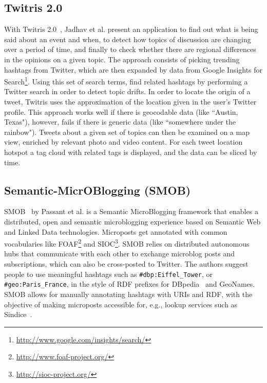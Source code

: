 \documentclass[runningheads,a4paper]{llncs}
\begin{document}
\subsection{Twitris 2.0}
With Twitris 2.0~\cite{Jadhav:Twitris}, Jadhav et al. present an application to find out what is being said about an event and when, to detect how topics of discussion are changing over a period of time, and finally to check whether there are regional differences in the opinions on a given topic. The approach consists of picking trending hashtags from Twitter, which are then expanded by data from Google Insights for Search\footnote{\url{http://www.google.com/insights/search/}}. Using this set of search terms, find related hashtags by performing a Twitter search in order to detect topic drifts. In order to locate the origin of a tweet, Twitris uses the approximation of the location given in the user's Twitter profile. This approach works well if there is geocodable data (like ``Austin, Texas"), however, fails if there is generic data (like ``somewhere under the rainbow"). Tweets about a given set of topics can then be examined on a map view, enriched by relevant photo and video content. For each tweet location hotspot a tag cloud with related tags is displayed, and the data can be sliced by time.

\subsection{Semantic-MicrOBlogging (SMOB)}
SMOB~\cite{Passant2008} by Passant et al. is a Semantic MicroBlogging framework that enables a distributed, open and semantic microblogging experience based on Semantic Web and Linked Data technologies. Microposts get annotated with common vocabularies like FOAF\footnote{\url{http://www.foaf-project.org/}} and SIOC\footnote{\url{http://sioc-project.org/}}. SMOB relies on distributed autonomous hubs that communicate with each other to exchange microblog posts and subscriptions, which can also be cross-posted to Twitter. The authors suggest people to use meaningful hashtags such as \texttt{\#dbp:Eiffel\_Tower}, or \texttt{\#geo:Paris\_France}, in the style of RDF prefixes for DBpedia~\cite{Bizer:DBpedia} and GeoNames. SMOB allows for manually annotating hashtags with URIs and RDF, with the objective of making microposts accessible for, e.g., lookup services such as Sindice~\cite{Tummarello:Sindice}.
\end{document}
